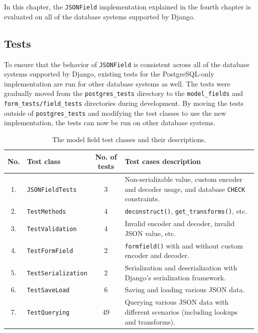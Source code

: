 \chapter{\babEnam}

In this chapter, the \verb|JSONField| implementation explained in the fourth
chapter is evaluated on all of the database systems supported by Django.

\section{Tests}

To ensure that the behavior of \verb|JSONField| is consistent across all of the
database systems supported by Django, existing tests for the PostgreSQL-only
implementation are run for other database systems as well. The tests were
gradually moved from the \verb|postgres_tests| directory to the
\verb|model_fields| and \verb|form_tests/field_tests| directories during
development. By moving the tests outside of \verb|postgres_tests| and modifying
the test classes to use the new implementation, the tests can now be run on
other database systems.

\begin{table}
	\centering
\begin{tabular}{|c|l|c|p{6.6cm}|}
\hline
No. & Test class                  & No. of tests & Test cases description \\ \hline
1.  & \texttt{JSONFieldTests}     & 3            & Non-serializable value, custom encoder and decoder usage, and database \texttt{CHECK} constraints. \\ \hline
2.  & \texttt{TestMethods}        & 4            & \texttt{deconstruct()}, \texttt{get\_transforms()}, etc. \\ \hline
3.  & \texttt{TestValidation}     & 4            & Invalid encoder and decoder, invalid JSON value, etc. \\ \hline
4.  & \texttt{TestFormField}      & 2            & \texttt{formfield()} with and without custom encoder and decoder. \\ \hline
5.  & \texttt{TestSerialization}  & 2            & Serialization and deserialization with Django's serialization framework. \\ \hline
6.  & \texttt{TestSaveLoad}  	  & 6            & Saving and loading various JSON data. \\ \hline
7.  & \texttt{TestQuerying}       & 49           & Querying various JSON data with different scenarios (including lookups and transforms). \\ \hline
\end{tabular}
\caption{The  model field test classes and their descriptions.}
\label{table:testclasses}
\end{table}

